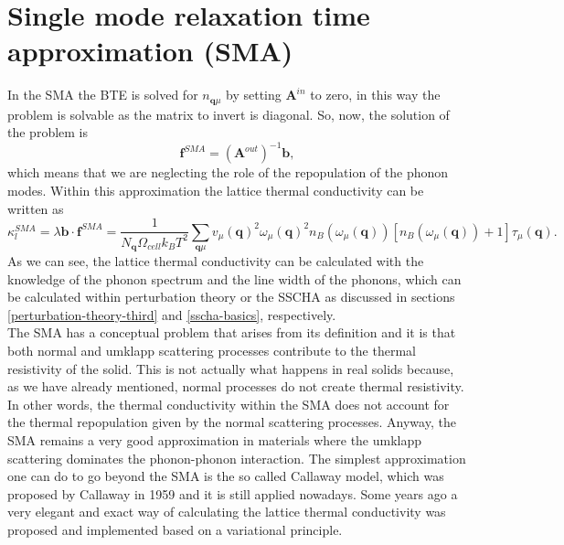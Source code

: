 \section{Single mode relaxation time approximation (SMA)}

In the SMA the BTE is solved for $n_{\mathbf{q}\mu}$ by setting $\mathbf{A}^{in}$ to zero, in this way the problem is solvable as the matrix to invert is diagonal. So, now, the solution of the problem is
\begin{equation}
 \mathbf{f}^{SMA}=(\mathbf{A}^{out})^{-1}\mathbf{b},
\end{equation}
which means that we are neglecting the role of the repopulation of the phonon modes. Within this approximation the lattice thermal conductivity can be written as
\begin{equation}
 \kappa_{l}^{SMA}=\lambda\mathbf{b}\cdot\mathbf{f}^{SMA}=\frac{1}{N_{\mathbf{q}}\Omega_{cell} k_{B}T^{2}}\sum_{\mathbf{q}\mu}v_{\mu}(\mathbf{q})^{2}\omega_{\mu}(\mathbf{q})^{2}n_{B}(\omega_{\mu}(\mathbf{q}))[n_{B}(\omega_{\mu}(
 \mathbf{q}))+1]\tau_{\mu}(\mathbf{q}).
\end{equation}
As we can see, the lattice thermal conductivity can be calculated with the knowledge of the phonon spectrum and the 
line width of the phonons, which can be calculated within perturbation theory or the SSCHA as discussed 
in sections \ref{perturbation-theory-third} and \ref{sscha-basics}, respectively. \\

The SMA has a conceptual problem that arises from its definition and it is that both normal and umklapp scattering processes contribute to the thermal 
resistivity of the solid. This is not actually what happens in real solids because, as we have already mentioned, normal processes do not create thermal resistivity. In other words, the thermal conductivity within the SMA does not 
account for the thermal repopulation given by the normal scattering processes. Anyway, the SMA remains a very good approximation in materials where the umklapp scattering dominates the phonon-phonon interaction. The simplest 
approximation one can do to go beyond the SMA is the so called Callaway model\cite{callaway1959model}, which was proposed by Callaway in 1959 and it is still applied nowadays. Some years ago a very elegant and exact way of 
calculating the lattice thermal conductivity was proposed\cite{fugallo2013ab} and implemented based on a variational principle. \\

